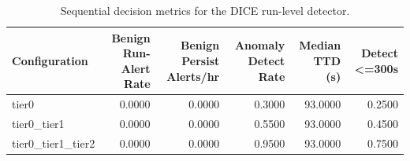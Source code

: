 \begin{table}[t]
\centering
\caption{Sequential decision metrics for the DICE run-level detector.}
\label{tab:dice_sequential_metrics}
\footnotesize
\begin{tabular}{lrrrrr}
\toprule
Configuration & Benign Run-Alert Rate & Benign Persist Alerts/hr & Anomaly Detect Rate & Median TTD (s) & Detect <=300s \\
\midrule
tier0 & 0.0000 & 0.0000 & 0.3000 & 93.0000 & 0.2500 \\
tier0_tier1 & 0.0000 & 0.0000 & 0.5500 & 93.0000 & 0.4500 \\
tier0_tier1_tier2 & 0.0000 & 0.0000 & 0.9500 & 93.0000 & 0.7500 \\
\bottomrule
\end{tabular}

\end{table}
